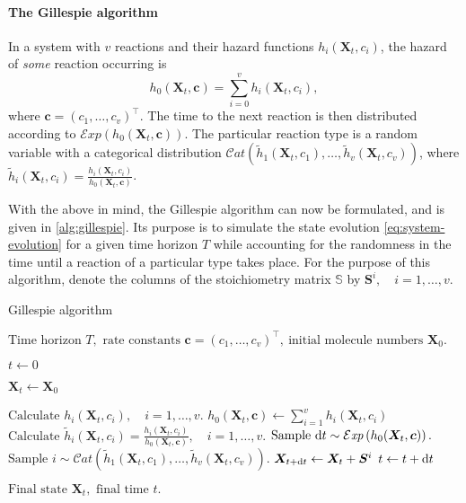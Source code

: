 \paragraph{The Gillespie algorithm}
In a system with $v$ reactions and their hazard functions $h_i(\bm{X}_t, c_i)$, the hazard of \emph{some} reaction occurring is
\begin{equation*}
h_0(\bm{X}_t, \bm{c}) = \sum_{i=0}^v h_i(\bm{X}_t, c_i),
\end{equation*}
where $\bm{c} = \left(c_1, \ldots, c_v\right)^\intercal$. The time to the next reaction is then distributed according to $\mathcal{E}\mathit{xp}\left(h_0(\bm{X}_t, \bm{c})\right)$. The particular reaction type is a random variable with a categorical distribution $\mathcal{C}\mathit{at}\left(\widetilde{h}_1(\bm{X}_t,c_1), \ldots, \widetilde{h}_v(\bm{X}_t,c_v)\right)$, where $\displaystyle \widetilde{h}_i(\bm{X}_t,c_i) = \frac{h_i(\bm{X}_t,c_i)}{h_0(\bm{X}_t, \bm{c})}$.

With the above in mind, the Gillespie algorithm can now be formulated, and is given in \autoref{alg:gillespie}. Its purpose is to simulate the state evolution \eqref{eq:system-evolution} for a given time horizon $T$ while accounting for the randomness in the time until a reaction of a particular type takes place. For the purpose of this algorithm, denote the columns of the stoichiometry matrix $\mathbb{S}$ by $\bm{S}^i, \quad i = 1, \ldots, v$.
\begin{algorithm}[ht]
    \caption{Gillespie algorithm}
    \label{alg:gillespie}
    \begin{algorithmic}[1]
        \Input $\text{Time horizon } T, \text{ rate constants } \bm{c} = \left(c_1, \ldots, c_v\right)^\intercal,\ \text{initial molecule numbers } \bm{X}_0.$
        
        \State $t \gets 0$
        
        \State $\bm{X}_t \gets \bm{X}_0$
        
            \State $\text{Calculate } h_i(\bm{X}_t, c_i), \quad i = 1, \ldots, v.$
            \State $h_0(\bm{X}_t, \bm{c}) \gets \sum_{i=1}^v h_i(\bm{X}_t, c_i)$
            \State $\text{Calculate } \displaystyle \widetilde{h}_i(\bm{X}_t,c_i) = \frac{h_i(\bm{X}_t,c_i)}{h_0(\bm{X}_t, \bm{c})}, \quad i = 1, \ldots, v.$
            \State $\text{Sample } \mathrm{d}{t} \sim \mathcal{E}\mathit{xp}\left(h_0(\bm{X}_t, \bm{c})\right).$ 
            \State $\text{Sample } i \sim \mathcal{C}\mathit{at}\left(\widetilde{h}_1(\bm{X}_t,c_1), \ldots, \widetilde{h}_v(\bm{X}_t,c_v)\right).$ 
            \State $\bm{X}_{t + \mathrm{d}{t}} \gets \bm{X}_t + \bm{S}^i$ 
            \State $t \gets t + \mathrm{d}{t}$
        \EndWhile
        
        \Output $\text{Final state } \bm{X}_t, \text { final time } t.$
    \end{algorithmic}
\end{algorithm}

